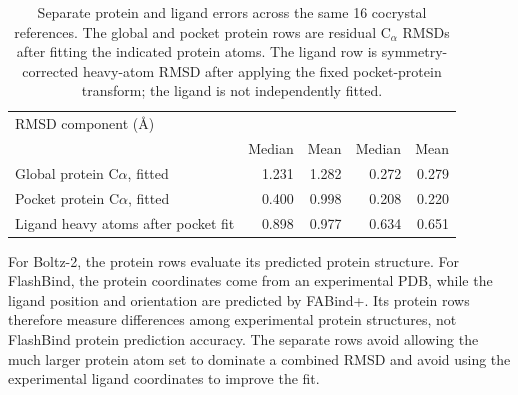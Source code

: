 \documentclass[11pt]{article}
\begin{document}
\begin{table}[H]
\centering
\footnotesize
\begin{tabular}{lrrrr}
\toprule
RMSD component (\AA)
& 
&  \\
\cmidrule(lr){2-3}\cmidrule(lr){4-5}
& Median & Mean & Median & Mean \\
\midrule
{}
Global protein C$\alpha$, fitted & 1.231 & 1.282 & 0.272 & 0.279 \\
Pocket protein C$\alpha$, fitted & 0.400 & 0.998 & 0.208 & 0.220 \\
Ligand heavy atoms after pocket fit & 0.898 & 0.977 & 0.634 & 0.651 \\
\bottomrule
\end{tabular}
\caption{Separate protein and ligand errors across the same 16 cocrystal
references. The global and pocket
protein rows are residual C$_\alpha$ RMSDs after fitting the indicated protein
atoms. The ligand row is symmetry-corrected heavy-atom RMSD after applying the
fixed pocket-protein transform; the ligand is not independently fitted.}
\end{table}

For Boltz-2, the protein rows evaluate its predicted protein structure. For
FlashBind, the protein coordinates come from an experimental PDB, while the
ligand position and orientation are predicted by FABind+. Its protein rows therefore measure
differences among experimental protein structures, not FlashBind protein
prediction accuracy. The separate rows
avoid allowing the much larger protein atom set to dominate a combined RMSD
and avoid using the experimental ligand coordinates to improve the fit.
\end{document}
